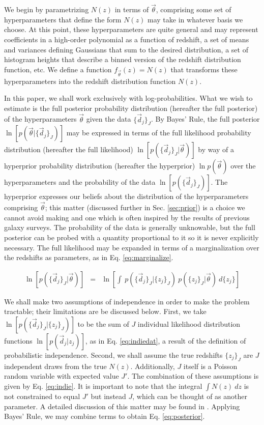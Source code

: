 \documentclass[preprint]{aastex}
\begin{document}
We begin by parametrizing $N(z)$ in terms of $\vec{\theta}$, comprising some 
set of hyperparameters that define the form $N(z)$ may take in whatever basis 
we choose.  At this point, these hyperparameters are quite general and may 
represent coefficients in a high-order polynomial as a function of redshift, a 
set of means and variances defining Gaussians that sum to the desired 
distribution, a set of histogram heights that describe a binned version of the 
redshift distribution function, etc.  We define a function 
$f_{\vec{\theta}}(z)=N(z)$ that transforms these hyperparameters into the 
redshift distribution function $N(z)$.

In this paper, we shall work exclusively with log-probabilities.  What we wish 
to estimate is the full posterior probability distribution (hereafter the full 
posterior) of the hyperparameters $\vec{\theta}$ given the data 
$\{\vec{d}_{j}\}_{J}$.  By Bayes' Rule, the full posterior 
$\ln[p(\vec{\theta}|\{\vec{d}_{j}\}_{J})]$ may be expressed in terms of the 
full likelihood probability distribution (hereafter the full likelihood) 
$\ln[p(\{\vec{d}_{j}\}_{J}|\vec{\theta})]$ by way of a hyperprior probability 
distribution (hereafter the hyperprior) $\ln p(\vec{\theta})$ over the 
hyperparameters and the probability of the data $\ln[p(\{\vec{d}_{j}\}_{J})]$.  
The hyperprior expresses our beliefs about the distribution of the 
hyperparameters comprising $\vec{\theta}$; this matter (discussed further in 
Sec. \ref{sec:prior}) is a choice we cannot avoid making and one which is often 
inspired by the results of previous galaxy surveys.  The probability of the 
data is generally unknowable, but the full posterior can be probed with a 
quantity proportional to it so it is never explicitly necessary.  The full 
likelihood may be expanded in terms of a marginalization over the redshifts as 
parameters, as in Eq. \ref{eq:marginalize}.  

\begin{eqnarray}
\label{eq:marginalize}
\ln[p(\{\vec{d}_{j}\}_{J}|\vec{\theta})] &=& \ln\left[\int\ 
p(\{\vec{d}_{j}\}_{J}|\{z_{j}\}_{J})\ p(\{z_{j}\}_{J}|\vec{\theta})\ 
d\{z_{j}\}\right]
\end{eqnarray}

We shall make two assumptions of independence in order to make the problem 
tractable; their limitations are be discussed below.  First, we take 
$\ln[p(\{\vec{d}_{j}\}_{J}|\{z_{j}\}_{J})]$ to be the sum of $J$ individual 
likelihood distribution functions $\ln[p(\vec{d}_{j}|z_{j})]$, as in Eq. 
\ref{eq:indiedat}, a result of the definition of probabilistic independence.  
Second, we shall assume the true redshifts $\{z_{j}\}_{J}$ are $J$ independent 
draws from the true $N(z)$.  Additionally, $J$ itself is a Poisson random 
variable with expected value $J'$.  The combination of these assumptions is 
given by Eq. \ref{eq:indie}.  It is important to note that the integral $\int 
N(z)\ dz$ is not constrained to equal $J'$ but instead $J$, which can be 
thought of as another parameter.  A detailed discussion of this matter may be 
found in \citet{Foreman-Mackey2014}.  Applying Bayes' Rule, we may combine 
terms to obtain Eq. \ref{eq:posterior}.  
\end{document}

